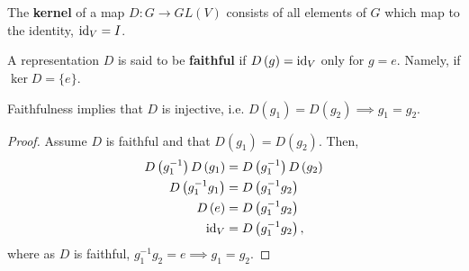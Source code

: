 
\newcommand{\Ad}{\text{Ad}}

\section{}

\begin{definition}
    The \textbf{kernel} of a map $D : G \to GL \left( V \right)$ consists of all elements of $G$ which map to the identity, $\text{id}_V = I$.
\end{definition}

\begin{definition}
    A representation $D$ is said to be \textbf{faithful} if $D \left( g \right) = \text{id}_V$ only for $g = e$. Namely, if $\ker D = \{e\} $.
\end{definition}

Faithfulness implies that $D$ is injective, i.e. $D\left( g_1 \right) = D\left( g_2 \right) \implies g_1 = g_2$.
\begin{proof}
    Assume $D$ is faithful and that $D \left( g_1 \right) = D\left( g_2 \right) $. Then,
    \begin{align}
        D\left( g^{-1}_1 \right) D\left( g_1 \right) &= D\left( g_1^{-1} \right) D\left( g_2 \right) \\
        D \left( g^{-1}_1 g_1 \right) &= D \left( g_1^{-1} g_2 \right)  \\
        D \left( e \right) &= D \left( g_1^{-1} g_2 \right) \\
        \text{id}_V &= D \left( g_1^{-1} g_2 \right)
    ,\end{align}
    where as $D$ is faithful, $g_1^{-1} g_2 = e \implies g_1 = g_2$.
\end{proof}

